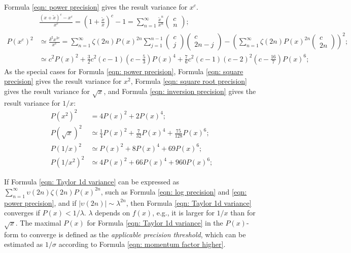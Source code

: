 \documentclass[twoside]{article}
\numberwithin{equation}{section}
\begin{document}
Formula \eqref{eqn: power precision} gives the result variance for $x^c$.
\begin{align}
\label{eqn: power Taylor}
&\frac{(x + \tilde{x})^c - x^c}{x^c} = (1 + \frac{\tilde{x}}{x})^c - 1 = \sum_{n=1}^{\infty} \frac{\tilde{x}^n}{x^n} \begin{pmatrix} c \\ n \end{pmatrix}; \\
\label{eqn: power precision}
P(x^c)^2 &\simeq \frac{\delta^2 x^{2c}}{x^c} = \sum_{n=1}^{\infty} \zeta(2n) P(x)^{2n} \sum_{j=1}^{n-1} \begin{pmatrix} c \\ j \end{pmatrix} \begin{pmatrix} c \\ 2n - j \end{pmatrix}
 - \left( \sum_{n=1}^{\infty} \zeta(2n) P(x)^{2n} \begin{pmatrix} c \\ 2n \end{pmatrix} \right)^2; \\
 &\simeq c^2 P(x)^2 + \frac{3}{2} c^2 (c-1) (c - \frac{5}{3}) P(x)^4 + \frac{7}{6} c^2 (c-1) (c-2)^2 (c - \frac{16}{7}) P(x)^6;
\end{align}
As the special cases for Formula \eqref{eqn: power precision}, Formula \eqref{eqn: square precision} gives the result variance for $x^2$, Formula \eqref{eqn: square root precision} gives the result variance for $\sqrt{x}$, and Formula \eqref{eqn: inversion precision} gives the result variance for $1/x$: 
\begin{align}
\label{eqn: square precision}
P(x^2)^2 &= 4 P(x)^2 + 2 P(x)^4; \\
\label{eqn: square root precision}
P(\sqrt{x})^2 &\simeq \frac{1}{4} P(x)^2 + \frac{7}{32} P(x)^4 + \frac{75}{128} P(x)^6; \\
\label{eqn: inversion precision}
P(1/x)^2 &\simeq P(x)^2 + 8 P(x)^4 + 69 P(x)^6; \\
\label{eqn: inversion square precision}
P(1/x^2)^2 &\simeq 4 P(x)^2 + 66 P(x)^4 + 960 P(x)^6;
\end{align}

If Formula \eqref{eqn: Taylor 1d variance} can be expressed as $\sum_{n=1}^{\infty} \upsilon(2n) \zeta(2n) P(x)^{2n}$, such as Formula \eqref{eqn: log precision} and \eqref{eqn: power precision}, and if $|\upsilon(2n)| \sim \lambda^{2n}$, then Formula \eqref{eqn: Taylor 1d variance} converges if $P(x) < 1/\lambda$.
$\lambda$ depends on $f(x)$, e.g., it is larger for $1/x$ than for $\sqrt{x}$.
The maximal $P(x)$ for Formula \eqref{eqn: Taylor 1d variance} in the $P(x)$-form to converge is defined as the \emph{applicable precision threshold}, which can be estimated as $1/\sigma$ according to Formula \eqref{eqn: momentum factor higher}.
\end{document}

